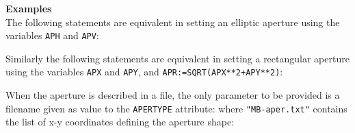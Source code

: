 \vskip 5mm

{\bf Examples}\\
The following statements are equivalent in setting an elliptic aperture 
using the variables {\tt APH} and {\tt APV}:

Similarly the following statements are equivalent in setting a rectangular 
aperture using the variables {\tt APX} and {\tt APY}, 
and {\tt APR:=SQRT(APX**2+APY**2)}:

When the aperture is described in a file, the only parameter to be provided is 
a filename given as value to the {\tt APERTYPE} attribute:
where {\tt "MB-aper.txt"} contains the list of x-y coordinates defining the
aperture shape:


